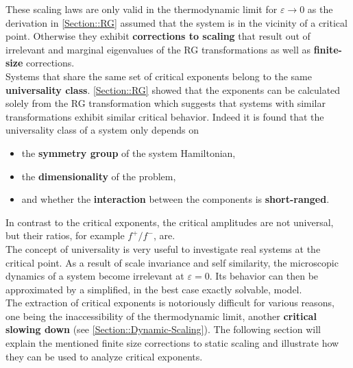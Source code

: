 	These scaling laws are only valid in the thermodynamic limit for $\varepsilon \rightarrow 0$ as the derivation in \autoref{Section::RG} assumed that the system is in the vicinity of a critical point. Otherwise they exhibit \textbf{corrections to scaling} that result out of irrelevant and marginal eigenvalues of the RG transformations as well as \textbf{finite-size} corrections. \\
	
	Systems that share the same set of critical exponents belong to the same \textbf{universality class}. \autoref{Section::RG} showed that the exponents can be calculated solely from the RG transformation which suggests that systems with similar transformations exhibit similar critical behavior. Indeed it is found that the universality class of a system only depends on
	\begin{itemize}
		\item the \textbf{symmetry group} of the system Hamiltonian,
		\item the \textbf{dimensionality} of the problem,
		\item and whether the \textbf{interaction} between the components is \textbf{short-ranged}.
	\end{itemize}
	In contrast to the critical exponents, the critical amplitudes are not universal, but their ratios, for example $f^+/f^-$, are.\\
	
	The concept of universality is very useful to investigate real systems at the critical point. As a result of scale invariance and self similarity, the microscopic dynamics of a system become irrelevant at $\varepsilon =	0$. Its behavior can then be approximated by a simplified, in the best case exactly solvable, model. \\
	
	The extraction of critical exponents is notoriously difficult for various reasons, one being the inaccessibility of the thermodynamic limit, another \textbf{critical slowing down} (see \autoref{Section::Dynamic-Scaling}). The following section will explain the mentioned finite size corrections to static scaling and illustrate how they can be used to analyze critical exponents.
